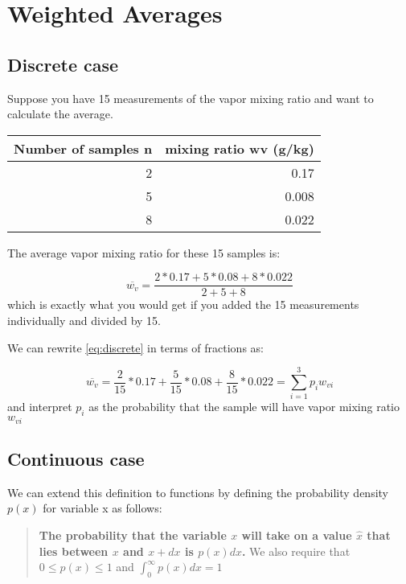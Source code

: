 \documentclass[12pt]{article}
\begin{document}
\newcommand{\vect}[1]{\boldsymbol{\vec{#1}}}
\pagestyle{first}

\section{Weighted Averages}
\label{sec:weighted-averages}

\subsection{Discrete case}
\label{sec:discrete-case}


Suppose you have 15 measurements of the vapor mixing ratio and want to calculate the average.  

\begin{center}
\begin{tabular}{rr}
Number of samples n & mixing ratio wv (g/kg)\\
\hline
2 & 0.17\\
5 & 0.008\\
8 & 0.022\\
\end{tabular}
\end{center}

The average vapor mixing ratio for these 15 samples is:

\begin{equation}
  \label{eq:discrete}
  \overline{w_v} = \frac{2*0.17 + 5*0.08 + 8*0.022}{2 + 5 + 8}
\end{equation}
which is exactly what you would get if you added the 15 measurements individually and divided by 15.

We can rewrite \eqref{eq:discrete} in terms of fractions as:

\begin{equation}
  \label{eq:discrete}
  \overline{w_v} = \frac{2}{15}*0.17 + \frac{5}{15}*0.08 + \frac{8}{15}*0.022 = \sum_{i=1}^{3} p_i w_{vi}
\end{equation}
and interpret $p_i$ as the probability that the sample will have vapor mixing ratio $w_{vi}$

\subsection{Continuous case}
\label{sec:continuous-case}

We can extend this definition to functions by defining the probability density $p(x)$ for variable x as follows:

\begin{quote}
  \textbf{The probability that the variable $x$ will take on a value $\hat{x}$ that lies between $x$ and $x + dx$ is
$p(x)dx$.} We also require that $0 \le p(x) \le 1$ and $\int_0^\infty p(x) dx = 1$
\end{quote}
\end{document}
